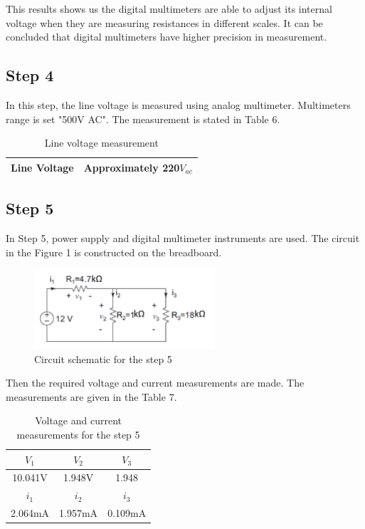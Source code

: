 \documentclass[letterpaper,12pt]{article}
\begin{document}
This results shows us the digital multimeters are able to adjust its internal voltage when they are measuring resistances in different scales. It can be concluded that digital multimeters have higher precision in measurement.

\subsection{Step 4}
In this step, the line voltage is measured using analog multimeter. Multimeters range is set "500V AC". The measurement is stated in Table 6.
\begin{table}[H]
	\begin{center}
		\begin{tabular}{|| c | c ||} 
		 \hline
		 Line Voltage & Approximately 220\(V_{ac}\) 		 \\ [0.5ex] 
		
		 \hline
		\end{tabular}
	\end{center}
	\caption{Line voltage measurement }
\end{table}

\subsection{Step 5}
In Step 5, power supply and digital multimeter instruments are used. The circuit in the Figure 1 is constructed on the breadboard. 
\begin{figure}[H]
	\caption{Circuit schematic for the step 5}
	\centering
	\includegraphics[width=0.6\textwidth]{5.png}
\end{figure} 
Then the required voltage and current measurements are made. The measurements are given in the Table 7.
\begin{table}[H]
	\centering
	\begin{tabular}{|| c | c | c ||}
		\hline
	\(V_1\) & \(V_2\) & \(V_3\) \\
	\hline
	10.041V & 1.948V & 1.948 \\
	\hline\hline
	\(i_1\) & \(i_2\) & \(i_3\) \\
	\hline
	2.064mA & 1.957mA & 0.109mA\\
	\hline
	\end{tabular}
	\caption{Voltage and current measurements for the step 5}
	
	\end{table}
\end{document}

